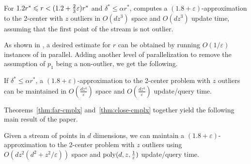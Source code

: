 \documentclass[envcountsame]{cls/cccg15}
\renewcommand{\O}{\ensuremath{{O}}}
\newcommand{\poly}{\mathop{\mathrm{poly}}}
\newcommand{\lee}{\leqslant}
\renewcommand{\leq}{\lee}
\renewcommand{\le}{\lee}
\newcommand{\eps}{\varepsilon}
\newcommand{\REM}[1]{}
\begin{document}
\begin{theorem} \label{thm:close}
	For $1.2r^* \le r < (1.2 + {2 \over 3}\eps)r^*$ and $\delta^* \le \alpha r^*$,
	 computes a $(1.8+\eps)$-approximation to 
	the 2-center with $z$ outliers 
	in $\O (dz^3)$ space and $\O (dz^3)$ update time,
	assuming that the first point of the stream is not outlier. 
\end{theorem}

\REM{
\begin{proof}
Since our algorithm considers all possible input cases of streaming points, there is at least one feasible solution. Since every feasible solution has its larger radius at most $3r/2$, the final solution has larger radius at most $3r/2 \le (1.8 + \eps)r^*$.
For space complexity, our algorithm maintains at most two balls in each case, and therefore it uses $\O(dz^3)$ space. Whenever the next point is inserted, the algorithm updates the solution for each subcase in $\O (d)$ time. Therefore, the algorithm spends $\O (dz^3)$ update time for each point of $P$. Answering a query consists of choosing the minimum radius among all the candidate solutions, which amounts to $\O (dz^3)$ time.
\end{proof}
}


\noindent
As shown in , a desired estimate for $r$ can be
obtained by running $O(1/\eps)$ instances of  in parallel.
Adding another level of parallelization to remove the assumption of $p_1$
being a non-outlier, we get the following.

\begin{theorem}
\label{thm:close-cmplx}
	If $\delta^* \leq \alpha r^*$, a $(1.8 + \eps)$-approximation to the 2-center problem with $z$ outliers 
	can be maintained in $\O(\frac{dz^4}{\eps})$ space 
	and $\O(\frac{dz^4}{\eps})$ update/query time.
\end{theorem}


\noindent
Theorems~\ref{thm:far-cmplx} and~\ref{thm:close-cmplx}
together yield the following main result of the paper.

\begin{theorem} \label{thm:1-center-stream}
	Given a stream of points in $d$ dimensions,
	we can maintain a $(1.8 + \eps)$-approximation to 
	the 2-center problem with $z$ outliers using 
	$\O(dz^2 (d^2 + z^2/\eps))$ space and 
	$\poly(d, z, {1 \over \eps})$ update/query time.
\end{theorem}
\end{document}
